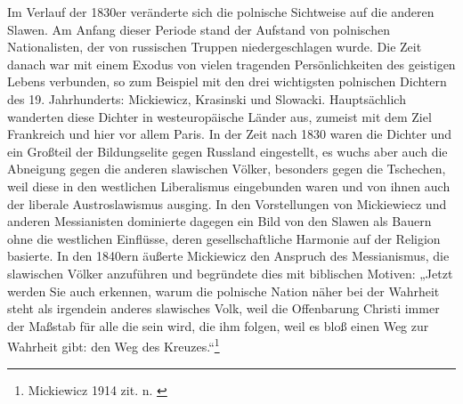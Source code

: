 \documentclass{../../sem_paper}
\begin{document}
Im Verlauf der 1830er veränderte sich die polnische Sichtweise auf die anderen Slawen. Am
Anfang dieser Periode stand der Aufstand von polnischen Nationalisten, der von russischen
Truppen niedergeschlagen wurde. Die Zeit danach war mit einem Exodus von vielen
tragenden Persönlichkeiten des geistigen Lebens verbunden, so zum Beispiel mit den drei
wichtigsten polnischen Dichtern des 19. Jahrhunderts: Mickiewicz, Krasinski und Slowacki.
Hauptsächlich wanderten diese Dichter in westeuropäische Länder aus, zumeist mit dem Ziel
Frankreich und hier vor allem Paris. In der Zeit nach 1830 waren die Dichter und ein Großteil
der Bildungselite gegen Russland eingestellt\autocite[252]{falkovic}, es wuchs aber auch
die Abneigung gegen die anderen slawischen Völker, besonders gegen die Tschechen, weil
diese in den westlichen Liberalismus eingebunden waren und von ihnen auch der liberale
Austroslawismus ausging. In den Vorstellungen von Mickiewiecz und anderen Messianisten
dominierte dagegen ein Bild von den Slawen als Bauern ohne die westlichen Einflüsse, deren
gesellschaftliche Harmonie auf der Religion basierte\autocite[50]{kohn}. In den 1840ern
äußerte Mickiewicz den Anspruch des Messianismus, die slawischen Völker anzuführen und
begründete dies mit biblischen Motiven: „Jetzt werden Sie auch erkennen, warum die
polnische Nation näher bei der Wahrheit steht als irgendein anderes slawisches Volk, weil die
Offenbarung Christi immer der Maßstab für alle die sein wird, die ihm folgen, weil es bloß
einen Weg zur Wahrheit gibt: den Weg des Kreuzes.“\footnote{Mickiewicz 1914 zit. n. \autocite[54]{kohn}} 
\end{document}

